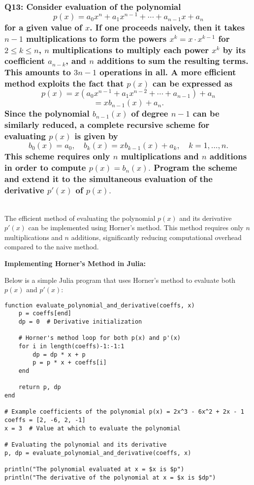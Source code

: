 \documentclass[8pt]{article}
\begin{document}
\subsubsection*{Q13: Consider evaluation of the polynomial
\[ p(x) = a_0x^n + a_1x^{n-1} + \cdots + a_{n-1}x + a_n \]
for a given value of \( x \). If one proceeds naively, then it takes \( n-1 \) multiplications to form the powers \( x^k = x \cdot x^{k-1} \) for \( 2 \leq k \leq n \), \( n \) multiplications to multiply each power \( x^k \) by its coefficient \( a_{n-k} \), and \( n \) additions to sum the resulting terms. This amounts to \( 3n - 1 \) operations in all. A more efficient method exploits the fact that \( p(x) \) can be expressed as 
\[ p(x) = x(a_0x^{n-1} + a_1x^{n-2} + \cdots + a_{n-1}) + a_n \]
\[ = x b_{n-1}(x) + a_n. \]
Since the polynomial \( b_{n-1}(x) \) of degree \( n - 1 \) can be similarly reduced, a complete recursive scheme for evaluating \( p(x) \) is given by 
\[ b_0(x) = a_0, \quad b_k(x) = x b_{k-1}(x) + a_k, \quad k = 1, \ldots, n. \]
This scheme requires only \( n \) multiplications and \( n \) additions in order to compute \( p(x) = b_n(x). \) Program the scheme and extend it to the simultaneous evaluation of the derivative \( p'(x) \) of \( p(x). \)}\\

The efficient method of evaluating the polynomial \(p(x)\) and its derivative \(p'(x)\) can be implemented using Horner's method. This method requires only \(n\) multiplications and \(n\) additions, significantly reducing computational overhead compared to the naive method.

\textbf{Implementing Horner's Method in Julia:}

Below is a simple Julia program that uses Horner's method to evaluate both \(p(x)\) and \(p'(x)\):

\begin{verbatim}
function evaluate_polynomial_and_derivative(coeffs, x)
    p = coeffs[end]
    dp = 0  # Derivative initialization
    
    # Horner's method loop for both p(x) and p'(x)
    for i in length(coeffs)-1:-1:1
        dp = dp * x + p
        p = p * x + coeffs[i]
    end
    
    return p, dp
end

# Example coefficients of the polynomial p(x) = 2x^3 - 6x^2 + 2x - 1
coeffs = [2, -6, 2, -1]
x = 3  # Value at which to evaluate the polynomial

# Evaluating the polynomial and its derivative
p, dp = evaluate_polynomial_and_derivative(coeffs, x)

println("The polynomial evaluated at x = $x is $p")
println("The derivative of the polynomial at x = $x is $dp")
\end{verbatim}
\end{document}
